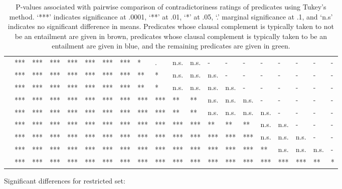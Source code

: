 \documentclass[11pt,fleqn]{article}
\newcommand{\6}{\mbox{$[\hspace*{-.6mm}[$}}
\newcommand{\9}{\mbox{$]\hspace*{-.6mm}]$}}
\begin{document}
\begin{landscape}
\begin{table}[h!]
\begin{tabular}{l l l l l l l l l l l l l l l l l l l l }
\color{green}{\em admit}\color{black}			& *** & *** & *** & *** & *** & *** & *** & * & . & n.s. & n.s. & - & - & - & - & - & - & - & - \\
\color{blue}{\em establish}\color{black}		& *** & *** & *** & *** & *** & *** & *** & ** & * & n.s. & n.s. &  n.s. & - & - & - & - & - & - & - \\
\color{green}{\em demonstrate}\color{black}	& *** & *** & *** & *** & *** & *** & *** & ** & * & n.s. & n.s. & n.s. & n.s. & - & - & - & - & - & - \\
\color{green}{\em confirm}\color{black}		& *** & *** & *** & *** & *** & *** & *** & *** & *** & ** & ** & n.s. & n.s. & n.s. & - & - & - & - & - \\
\color{blue}{\em discover}\color{black}		& *** & *** & *** & *** & *** & *** & *** & *** & *** & ** & ** & n.s. & n.s. & n.s. & n.s. & - & - & - & - \\
\color{blue}{\em see}\color{black}			& *** & *** & *** & *** & *** & *** & *** & *** & *** & *** & *** & ** & ** & ** & n.s. & n.s. & - & - & - \\
\color{blue}{\em know}\color{black}			& *** & *** & *** & *** & *** & *** & *** & *** & *** & *** & *** & *** & *** & *** & n.s. & n.s. & n.s. & - & - \\
\color{green}{\em prove}\color{black}			& *** & *** & *** & *** & *** & *** & *** & *** & *** & *** & *** & *** & *** & *** & ** & n.s. & n.s. & n.s. & -  \\
\color{blue}{\em be right}\color{black}		& *** & *** & *** & *** & *** & *** & *** & *** & ***  & ***  & *** & *** & *** & *** & *** & *** & *** & ** & *  \\

\bottomrule
\end{tabular}
\caption{P-values associated with pairwise comparison of contradictoriness ratings of predicates using Tukey's method. `***' indicates significance at .0001, `**' at .01, `*' at .05, `.' marginal significance at .1, and `n.s' indicates no significant difference in means. Predicates whose clausal complement is typically taken to not be an entailment are given in brown, predicates whose clausal complement is typically taken to be an entailment are given in blue, and the remaining predicates are given in green.}\label{t-pairwise}
\end{table}
\end{landscape}


\newpage

Significant differences for restricted set:
\end{document}
